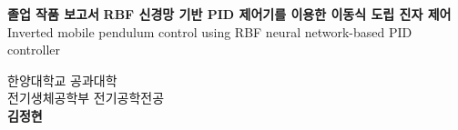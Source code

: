 \begin{titlepage}
    \begin{center}
    	\textbf{\fontsize{17}{17}\selectfont 졸업 작품 보고서}  
        \vfill
        \textbf{\fontsize{22}{22}\selectfont RBF 신경망 기반 PID 제어기를 이용한 이동식 도립 진자 제어} \\  
        \vspace{5mm} %
        \vspace{5mm} %
        \textnormal{\fontsize{13}{13}\selectfont Inverted mobile pendulum control using RBF neural network-based PID controller} 
        \vfill
        \vfill
        \vfill
        \vfill
        
        
        
        \textnormal{\fontsize{22}{22}\selectfont  한양대학교 공과대학 } \\
        \textnormal{\newline \fontsize{17}{17}\selectfont  전기생체공학부 전기공학전공} \\
        \textbf{\newline \fontsize{22}{22}\selectfont 김정현}\\
        \vspace{5pt}
        \textnormal{\fontsize{17}{17}}
    \end{center}
\end{titlepage}